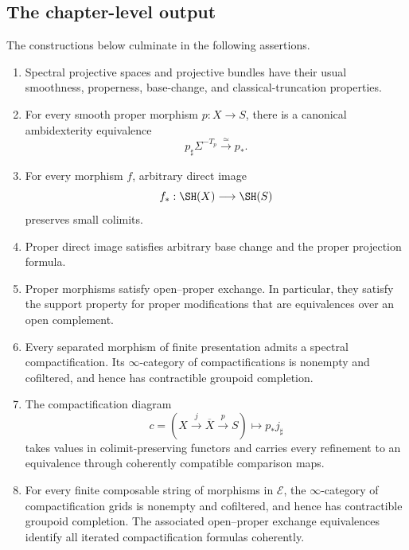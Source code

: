 \subsection{The chapter-level output}

The constructions below culminate in the following assertions.
\begin{enumerate}
    \item Spectral projective spaces and projective bundles have their usual
    smoothness, properness, base-change, and classical-truncation properties.

    \item For every smooth proper morphism \(p:X\to S\), there is a canonical
    ambidexterity equivalence
    \[
        p_\sharp\Sigma^{-T_p}
        \xrightarrow{\simeq}
        p_*.
    \]

    \item For every morphism \(f\), arbitrary direct image
    \[
        f_*:\SH(X)\longrightarrow\SH(S)
    \]
    preserves small colimits.

    \item Proper direct image satisfies arbitrary base change and the proper
    projection formula.

    \item Proper morphisms satisfy open--proper exchange.  In particular,
    they satisfy the support property for proper modifications that are
    equivalences over an open complement.

    \item Every separated morphism of finite presentation admits a spectral
    compactification.  Its \(\infty\)-category of compactifications is
    nonempty and cofiltered, and hence has contractible groupoid completion.

    \item The compactification diagram
    \[
        c=(X\xrightarrow{j}\overline X\xrightarrow{p}S)
        \longmapsto
        p_*j_\sharp
    \]
    takes values in colimit-preserving functors and carries every refinement
    to an equivalence through coherently compatible comparison maps.

    \item For every finite composable string of morphisms in \(\mathcal E\),
    the \(\infty\)-category of compactification grids is nonempty and
    cofiltered, and hence has contractible groupoid completion.  The
    associated open--proper exchange equivalences identify all iterated
    compactification formulas coherently.
\end{enumerate}

